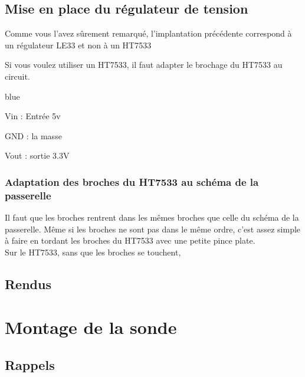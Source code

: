 \section{Mise en place du régulateur de tension}

Comme vous l'avez sûrement remarqué, l'implantation précédente correspond à un régulateur LE33 et non à un HT7533

Si vous voulez utiliser un HT7533, il faut adapter le brochage du HT7533 au circuit.

\begin{items}{blue}{\Triangle}
    \item Vin : Entrée 5v
    \item GND : la masse
    \item Vout : sortie 3.3V
\end{items}


\subsection{Adaptation des broches du HT7533 au schéma de la passerelle}

Il faut que les broches  rentrent dans les mêmes broches que celle du schéma de la passerelle. Même si les broches ne sont pas dans le même ordre, c'est assez simple à faire en tordant les broches du HT7533 avec une petite pince plate.\\

Sur le HT7533, sans que les broches se touchent, 


\section{Rendus}

\chapter{Montage de la sonde}


\section{Rappels}


